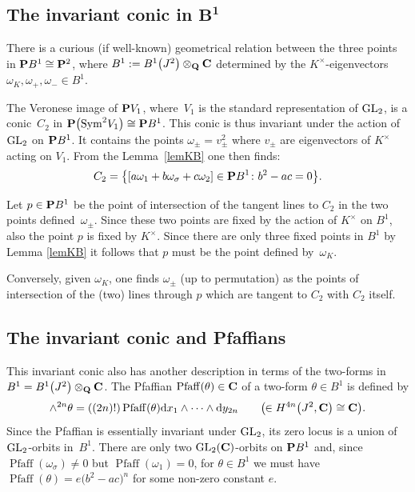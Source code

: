 \documentclass[pdftex]{sigma}
\numberwithin{equation}{section}
\begin{document}
\subsection[The invariant conic in B\^{}1]{The invariant conic in $\boldsymbol{B^1}$}\label{invcon}

There is a curious (if well-known) geometrical relation between the three
points in ${\bf P} B^1\cong{\bf P}^2$, where $B^1:=B^1\big(J^2\big)\otimes_{\bf Q} {\bf C}$
determined by the $K^\times$-eigenvectors
$\omega_K, \omega_+, \omega_-\in B^1$.

The Veronese image of ${\bf P} V_1$, where~$V_1$ is the standard representation of ${\rm GL}_2$,
is a conic~$C_2$ in ${\bf P}\big({\operatorname{Sym}}^2 V_1\big)\cong{\bf P} B^1$. This conic is thus invariant under the action
of ${\rm GL}_2$ on ${\bf P} B^1$.
It contains the points $\omega_\pm=v^2_\pm$
where $v_\pm$ are eigenvectors of $K^\times$ acting on $V_1$.
From the Lemma~\ref{lemKB} one then finds:
\[
C_2 = \big\{[a\omega_1+b\omega_\sigma+c\omega_2] \in {\bf P} B^1\colon b^2-ac = 0 \big\}.
\]

Let $p\in {\bf P} B^1$ be the point of intersection of the tangent lines to $C_2$ in the
two points defined~$\omega_\pm$. Since these two points are fixed by the action of $K^\times$
on $B^1$, also the point $p$ is fixed by $K^\times$. Since there are only three fixed
points in $B^1$ by Lemma \ref{lemKB} it follows that $p$ must be the point
defined by~$\omega_K$.

Conversely, given $\omega_K$, one finds $\omega_\pm$ (up to permutation) as the
points of intersection of the (two) lines through $p$ which are tangent to $C_2$
with $C_2$ itself.

\subsection{The invariant conic and Pfaffians} \label{pfaff}
This invariant conic also has another description in terms of the two-forms in
$B^1=B^1\big(J^2\big)\otimes_{\bf Q}{\bf C}$.
The Pfaffian $\operatorname{Pfaff}(\theta)\in{\bf C}$ of a two-form $\theta\in B^1$
is defined by
\[
\wedge^{2n}\theta =
((2n)!)\operatorname{Pfaff}(\theta){\rm d} x_1\wedge\dots\wedge{\rm d} y_{2n}\qquad\big(\!\!\in H^{4n}\big(J^2,{\bf C}\big) \cong {\bf C}\big).
\]
Since the Pfaffian is essentially invariant under ${\rm GL}_2$, its zero locus is a union of
${\rm GL}_2$-orbits in~$B^1$. There are only two ${\rm GL}_2({\bf C})$-orbits on ${\bf P} B^1$
and, since $\operatorname{Pfaff}(\omega_\sigma)\neq 0$ but
$\operatorname{Pfaff}(\omega_1)=0$, for $\theta\in B^1$ we must have $\operatorname{Pfaff}(\theta)=e\big(b^2-ac\big)^n$
for some non-zero constant $e$.
\end{document}
